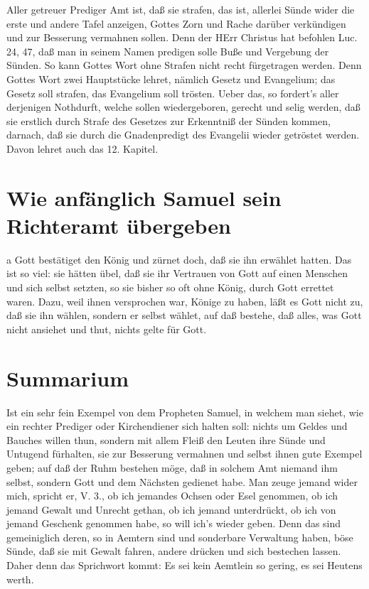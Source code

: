 Aller getreuer Prediger Amt ist, daß sie strafen, das ist, allerlei Sünde wider die erste und andere Tafel anzeigen, Gottes Zorn und Rache darüber verkündigen und zur Besserung vermahnen sollen. Denn der HErr Christus hat befohlen Luc. 24, 47, daß man in seinem Namen predigen solle Buße und Vergebung der Sünden. So kann Gottes Wort ohne Strafen nicht recht fürgetragen werden. Denn Gottes Wort zwei Hauptstücke lehret, nämlich Gesetz und Evangelium; das Gesetz soll strafen, das Evangelium soll trösten. Ueber das, so fordert's aller derjenigen Nothdurft, welche sollen wiedergeboren, gerecht und selig werden, daß sie erstlich durch Strafe des Gesetzes zur Erkenntniß der Sünden kommen, darnach, daß sie durch die Gnadenpredigt des Evangelii wieder getröstet werden. Davon lehret auch das 12. Kapitel.

\section{Wie anfänglich Samuel sein Richteramt übergeben}

a Gott bestätiget den König und zürnet doch, daß sie ihn erwählet hatten. Das ist so viel: sie hätten übel, daß sie ihr Vertrauen von Gott auf einen Menschen und sich selbst setzten, so sie bisher so oft ohne König, durch Gott errettet waren. Dazu, weil ihnen versprochen war, Könige zu haben, läßt es Gott nicht zu, daß sie ihn wählen, sondern er selbst wählet, auf daß bestehe, daß alles, was Gott nicht ansiehet und thut, nichts gelte für Gott.

\section{Summarium}

Ist ein sehr fein Exempel von dem Propheten Samuel, in welchem man siehet, wie ein rechter Prediger oder Kirchendiener sich halten soll: nichts um Geldes und Bauches willen thun, sondern mit allem Fleiß den Leuten ihre Sünde und Untugend fürhalten, sie zur Besserung vermahnen und selbst ihnen gute Exempel geben; auf daß der Ruhm bestehen möge, daß in solchem Amt niemand ihm selbst, sondern Gott und dem Nächsten gedienet habe. Man zeuge jemand wider mich, spricht er, V. 3., ob ich jemandes Ochsen oder Esel genommen, ob ich jemand Gewalt und Unrecht gethan, ob ich jemand unterdrückt, ob ich von jemand Geschenk genommen habe, so will ich's wieder geben. Denn das sind gemeiniglich deren, so in Aemtern sind und sonderbare Verwaltung haben, böse Sünde, daß sie mit Gewalt fahren, andere drücken und sich bestechen lassen. Daher denn das Sprichwort kommt: Es sei kein Aemtlein so gering, es sei Heutens werth.

